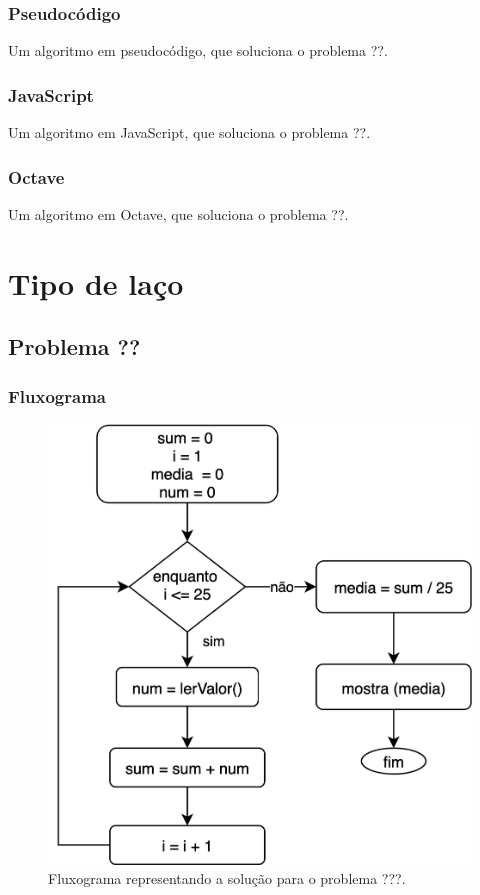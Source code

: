 \subsubsection*{Pseudocódigo}
Um algoritmo em pseudocódigo, que soluciona o problema ??.
\begin{pseudocode}
\end{pseudocode}


\subsubsection*{JavaScript}
Um algoritmo em JavaScript, que soluciona o problema ??.
\begin{code}
\end{code}

\subsubsection*{Octave}
Um algoritmo em Octave, que soluciona o problema ??.
\begin{code}
\end{code}



\section{Tipo de laço}
\label{sec:tipolaco}

\subsection{Problema ??}
\label{sec:problema?}

\subsubsection*{Fluxograma}
\begin{figure}[h]
  \begin{center}
    \includegraphics[width=0.5\linewidth]{img/problemaWhile2.png}
    \caption{Fluxograma representando a solução para o problema ???.}
    \label{fig:problema???}
  \end{center}
\end{figure}

